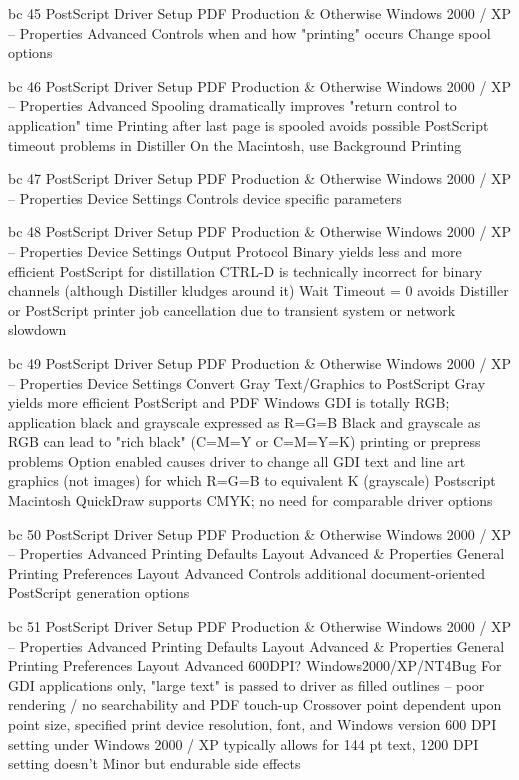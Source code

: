 \documentclass[11pt,a4paper]{article}
\begin{document}
bc 45 PostScript Driver Setup PDF Production \& Otherwise Windows 2000 / XP -- Properties Advanced Controls when and how "printing" occurs Change spool options

bc 46 PostScript Driver Setup PDF Production \& Otherwise Windows 2000 / XP -- Properties Advanced Spooling dramatically improves "return control to application" time Printing after last page is spooled avoids possible PostScript timeout problems in Distiller On the Macintosh, use Background Printing

bc 47 PostScript Driver Setup PDF Production \& Otherwise Windows 2000 / XP -- Properties Device Settings Controls device specific parameters

bc 48 PostScript Driver Setup PDF Production \& Otherwise Windows 2000 / XP -- Properties Device Settings Output Protocol Binary yields less and more efficient PostScript for distillation CTRL-D is technically incorrect for binary channels (although Distiller kludges around it) Wait Timeout = 0 avoids Distiller or PostScript printer job cancellation due to transient system or network slowdown

bc 49 PostScript Driver Setup PDF Production \& Otherwise Windows 2000 / XP -- Properties Device Settings Convert Gray Text/Graphics to PostScript Gray yields more efficient PostScript and PDF Windows GDI is totally RGB; application black and grayscale expressed as R=G=B Black and grayscale as RGB can lead to "rich black" (C=M=Y or C=M=Y=K) printing or prepress problems Option enabled causes driver to change all GDI text and line art graphics (not images) for which R=G=B to equivalent K (grayscale) Postscript Macintosh QuickDraw supports CMYK; no need for comparable driver options

bc 50 PostScript Driver Setup PDF Production \& Otherwise Windows 2000 / XP -- Properties Advanced Printing Defaults Layout Advanced \& Properties General Printing Preferences Layout Advanced Controls additional document-oriented PostScript generation options

bc 51 PostScript Driver Setup PDF Production \& Otherwise Windows 2000 / XP -- Properties Advanced Printing Defaults Layout Advanced \& Properties General Printing Preferences Layout Advanced 600DPI? Windows2000/XP/NT4Bug For GDI applications only, "large text" is passed to driver as filled outlines -- poor rendering / no searchability and PDF touch-up Crossover point dependent upon point size, specified print device resolution, font, and Windows version 600 DPI setting under Windows 2000 / XP typically allows for 144 pt text, 1200 DPI setting doesn't Minor but endurable side effects
\end{document}
